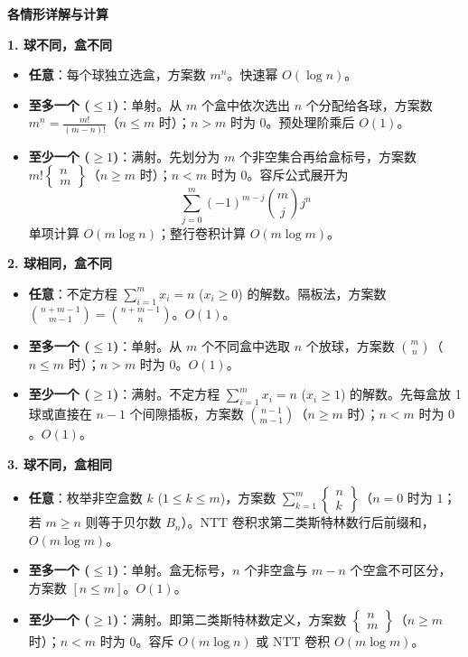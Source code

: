 \textbf{各情形详解与计算}

\textbf{1. 球不同，盒不同}
\begin{itemize}
	\item \textbf{任意}：每个球独立选盒，方案数 $m^n$。快速幂 $O(\log n)$。
	\item \textbf{至多一个 ($\le 1$)}：单射。从 $m$ 个盒中依次选出 $n$ 个分配给各球，方案数 $m^{\underline{n}} = \frac{m!}{(m-n)!}$（$n \le m$ 时）；$n > m$ 时为 $0$。预处理阶乘后 $O(1)$。
	\item \textbf{至少一个 ($\ge 1$)}：满射。先划分为 $m$ 个非空集合再给盒标号，方案数 $m! \left\{ \begin{matrix} n \\ m \end{matrix} \right\}$（$n \ge m$ 时）；$n < m$ 时为 $0$。容斥公式展开为
	\[
	\sum_{j=0}^m (-1)^{m-j} \binom{m}{j} j^n
	\]
	单项计算 $O(m \log n)$；整行卷积计算 $O(m \log m)$。
\end{itemize}

\textbf{2. 球相同，盒不同}
\begin{itemize}
	\item \textbf{任意}：不定方程 $\sum_{i=1}^m x_i = n$ ($x_i \ge 0$) 的解数。隔板法，方案数 $\binom{n+m-1}{m-1} = \binom{n+m-1}{n}$。$O(1)$。
	\item \textbf{至多一个 ($\le 1$)}：单射。从 $m$ 个不同盒中选取 $n$ 个放球，方案数 $\binom{m}{n}$（$n \le m$ 时）；$n > m$ 时为 $0$。$O(1)$。
	\item \textbf{至少一个 ($\ge 1$)}：满射。不定方程 $\sum_{i=1}^m x_i = n$ ($x_i \ge 1$) 的解数。先每盒放 1 球或直接在 $n-1$ 个间隙插板，方案数 $\binom{n-1}{m-1}$（$n \ge m$ 时）；$n < m$ 时为 $0$。$O(1)$。
\end{itemize}

\textbf{3. 球不同，盒相同}
\begin{itemize}
	\item \textbf{任意}：枚举非空盒数 $k$ ($1 \le k \le m$)，方案数 $\sum_{k=1}^m \left\{ \begin{matrix} n \\ k \end{matrix} \right\}$（$n=0$ 时为 $1$；若 $m \ge n$ 则等于贝尔数 $B_n$）。NTT 卷积求第二类斯特林数行后前缀和，$O(m \log m)$。
	\item \textbf{至多一个 ($\le 1$)}：单射。盒无标号，$n$ 个非空盒与 $m-n$ 个空盒不可区分，方案数 $[n \le m]$。$O(1)$。
	\item \textbf{至少一个 ($\ge 1$)}：满射。即第二类斯特林数定义，方案数 $\left\{ \begin{matrix} n \\ m \end{matrix} \right\}$（$n \ge m$ 时）；$n < m$ 时为 $0$。容斥 $O(m \log n)$ 或 NTT 卷积 $O(m \log m)$。
\end{itemize}

